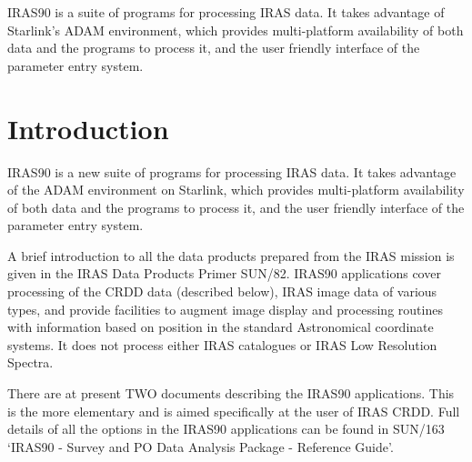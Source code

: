 \documentclass[twoside,11pt]{article}
\newcommand{\stardocinitials}  {SUN}
\newcommand{\stardocnumber}    {161.2}
\newcommand{\stardocabstract}  {
IRAS90 is a suite of programs for processing IRAS data. It takes advantage
of Starlink's ADAM environment, which provides multi-platform availability
of both data and the programs to process it, and the user friendly interface of
the parameter entry system.
}
\newcommand{\stardocname}{\stardocinitials /\stardocnumber}
\newenvironment{latexonly}{}{}
\newcommand{\xref}[3]{#1}
\newcommand{\xlabel}[1]{}
\renewcommand{\thepage}{\roman{page}}
\begin{document}
\stardocabstract
\newpage
\begin{latexonly}
   \setlength{\parskip}{0mm}
   \tableofcontents
   \setlength{\parskip}{\medskipamount}
   \markright{\stardocname}
\end{latexonly}
\newpage
\renewcommand{\thepage}{\arabic{page}}
\setcounter{page}{1}

\section{Introduction
\xlabel{introduction}\label{m:intro}}

IRAS90 is a new suite of programs for processing IRAS data. It takes advantage
of the ADAM environment on Starlink, which provides multi-platform availability
of both data and the programs to process it, and the user friendly interface of
the parameter entry system.

A brief introduction to all the data products prepared from the IRAS mission
is given in the IRAS Data Products Primer
\xref{SUN/82}{sun82}{}. IRAS90 applications cover
processing of the CRDD data (described below), IRAS image data of various types,
and provide facilities to augment image display and processing routines with
information based on position in the standard Astronomical coordinate systems.
It does not process either IRAS catalogues or IRAS Low Resolution Spectra.

There are at present TWO documents describing the IRAS90 applications. This is
the more elementary and is aimed specifically at the user of IRAS CRDD. Full
details of all the options in the IRAS90 applications can be found in
\xref{SUN/163}{sun163}{}
`IRAS90 - Survey and PO Data Analysis Package - Reference Guide'.
\end{document}
